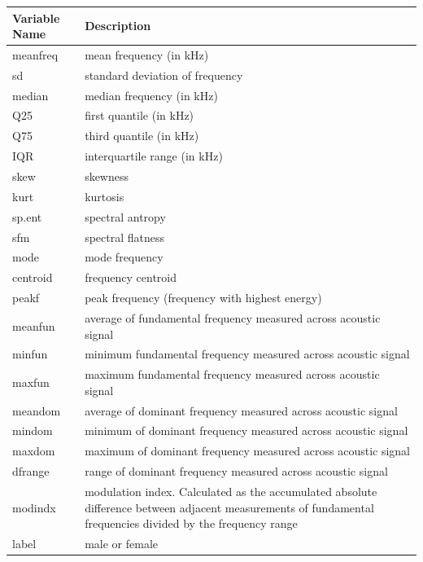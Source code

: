\documentclass[a4paper]{article}
\begin{document}
\begin{center}
\begin{tabular}{ m{5em} | m{10cm}}
\toprule
Variable Name & Description
\tabularnewline
\midrule
meanfreq & mean frequency (in kHz)
\tabularnewline
sd & standard deviation of frequency
\tabularnewline
median & median frequency (in kHz)
\tabularnewline
Q25 & first quantile (in kHz)
\tabularnewline
Q75 & third quantile (in kHz)
\tabularnewline
IQR & interquartile range (in kHz)
\tabularnewline
skew & skewness
\tabularnewline
kurt & kurtosis
\tabularnewline
sp.ent & spectral antropy
\tabularnewline
sfm & spectral flatness
\tabularnewline
mode & mode frequency
\tabularnewline
centroid & frequency centroid
\tabularnewline
peakf & peak frequency (frequency with highest energy)
\tabularnewline
meanfun & average of fundamental frequency measured across acoustic signal
\tabularnewline
minfun & minimum fundamental frequency measured across acoustic signal
\tabularnewline
maxfun & maximum fundamental frequency measured across acoustic signal 
\tabularnewline
meandom & average of dominant frequency measured across acoustic signal 
\tabularnewline
mindom & minimum of dominant frequency measured across acoustic signal 
\tabularnewline
maxdom & maximum of dominant frequency measured across acoustic signal 
\tabularnewline
dfrange & range of dominant frequency measured across acoustic signal 
\tabularnewline
modindx & modulation index. Calculated as the accumulated absolute difference between adjacent measurements of fundamental frequencies divided by the frequency range 
\tabularnewline
label & male or female
\tabularnewline

\bottomrule
\end{tabular}
\end{center}
\end{document}
